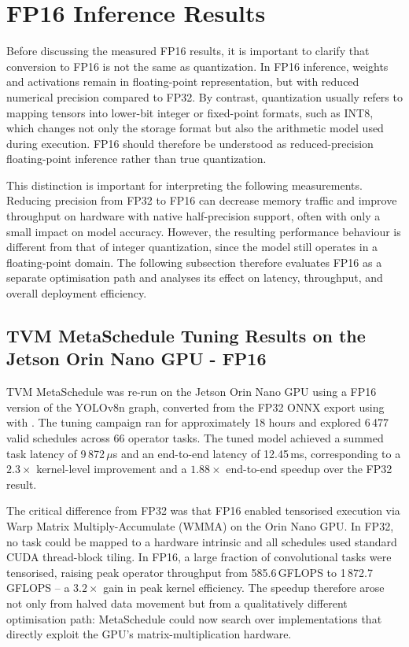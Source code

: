 \documentclass[12pt,a4paper]{report}
\begin{document}
\section{FP16 Inference Results}

Before discussing the measured FP16 results, it is important to clarify that conversion to FP16 is not
the same as quantization. In FP16 inference, weights and activations remain in floating-point representation,
but with reduced numerical precision compared to FP32. By contrast, quantization usually refers
to mapping tensors into lower-bit integer or fixed-point formats, such as INT8,
which changes not only the storage format but also the arithmetic model used
during execution. FP16 should therefore be understood as reduced-precision
floating-point inference rather than true quantization.

This distinction is important for interpreting the following measurements. Reducing precision from FP32 to FP16 can
decrease memory traffic and improve throughput on hardware with native half-precision support, often with only a
small impact on model accuracy. However, the resulting performance behaviour is different from that of integer
quantization, since the model still operates in a floating-point domain.
The following subsection therefore evaluates FP16 as a  separate optimisation path and analyses
its effect on latency, throughput, and overall deployment efficiency.

\subsection{TVM MetaSchedule Tuning Results on the Jetson Orin Nano GPU - FP16}

TVM MetaSchedule was re-run on the Jetson Orin Nano GPU using a FP16 version of the YOLOv8n graph,
converted from the FP32 ONNX export using  with .
The tuning campaign ran for approximately 18 hours and explored 6\,477 valid schedules across 66 operator
tasks.
The tuned model achieved a summed task latency of 9\,872\,$\mu$s and an end-to-end latency of 12.45\,ms,
corresponding to a \(2.3\times\) kernel-level improvement and a \(1.88\times\) end-to-end speedup over the
FP32 result.

The critical difference from FP32 was that FP16 enabled tensorised execution via Warp Matrix Multiply-Accumulate (WMMA)
on the Orin Nano GPU.
In FP32, no task could be mapped to a hardware intrinsic and all schedules used standard CUDA thread-block
tiling.
In FP16, a large fraction of convolutional tasks were tensorised, raising peak operator throughput from
585.6\,GFLOPS to 1\,872.7\,GFLOPS -- a \(3.2\times\) gain in peak kernel efficiency.
The speedup therefore arose not only from halved data movement but from a qualitatively different
optimisation path: MetaSchedule could now search over implementations that directly exploit the GPU's
matrix-multiplication hardware.
\end{document}
